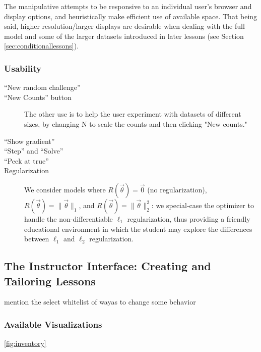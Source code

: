 \documentclass[11pt,letterpaper]{article}
\begin{document}
The manipulative attempts to be responsive to an individual user's browser and display options, and heuristically make efficient use of available space. That being said, higher resolution/larger displays are desirable when dealing with the full model and some of the larger datasets introduced in later lessons (see Section \ref{sec:conditionallessons}).


\subsubsection{Usability}
\begin{description}
\item[``New random challenge'']
\item[``New Counts'' button] The other use is to help the user experiment with datasets of different sizes, by changing N to scale the counts and then clicking "New counts."
\item[``Show gradient'']
\item[``Step'' and ``Solve'']
\item[``Peek at true'']
\item[Regularization] We consider models where $R(\vec{\theta}) = \vec{0}$ (no regularization), $R(\vec{\theta}) = \|\vec\theta\|_1$, and $R(\vec{\theta}) = \|\vec{\theta}\|_2^2$: we special-case the optimizer to handle the non-differentiable $\ell_1$ regularization, thus providing a friendly educational environment in which the student may explore the differences between $\ell_1$ and $\ell_2$ regularization.
\end{description}

\subsection{The Instructor Interface: Creating and Tailoring Lessons}
mention the select whitelist of wayas to change some behavior
\subsubsection{Available Visualizations}\label{sec:available_vis}

\ref{fig:inventory}
\end{document}
